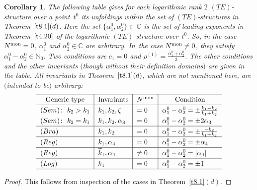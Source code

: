 \documentclass[pdftex]{sigma}%
\numberwithin{equation}{section}
\numberwithin{figure}{section}
\newcommand{\N}{{\mathbb N}}
\newcommand{\C}{{\mathbb C}}
\newcommand{\www}{\widetilde}
\newtheorem{Corollary}[Theorem]{Corollary}
\begin{document}
\begin{Corollary}\label{t8.3}
The following table gives for each logarithmic rank $2$
$(TE)$-structure over a point~$t^0$ its unfoldings within
the set of $(TE)$-structures in Theorem~$\ref{t8.1}(d)$.
Here the set $\big\{\alpha_1^0,\alpha_2^0\big\}\subset\C$ is the
set of leading exponents in Theorem~$\ref{t4.20}$ of the
logarithmic $(TE)$-structure over~$t^0$.
So, in the case $N^{\rm mon}=0$, $\alpha_1^0$ and $\alpha_2^0\in\C$
are arbitrary. In~the case $N^{\rm mon}\neq 0$, they satisfy
$\alpha_1^0-\alpha_2^0\in\N_0$. Two conditions are
$c_1=0$ and $\rho^{(1)}=\frac{\alpha_1^0+\alpha_2^0}{2}$.
The other conditions and the other invariants
$($though without their definition domains$)$
are given in the table.
All invariants in Theorem~$\ref{t8.1}(d)$, which are not
mentioned here, are $($intended to be$)$ arbitrary:
\begin{gather}\label{8.11}
\def\arraystretch{1.25}
\begin{tabular}{l|l|l|l}
\hline
\multicolumn{1}{c|}{Generic type}&\multicolumn{1}{c|}{Invariants} & \multicolumn{1}{c|}{$N^{\rm mon}$} &\multicolumn{1}{c}{Condition}
\\
\hline
$(Sem)\colon\ k_2>k_1$ & $k_1,k_2,\zeta$ & $=0$&
$\alpha_1^0-\alpha_2^0=\pm \frac{k_1-k_2}{k_1+k_2}$
\\
$(Sem)\colon\ k_2=k_1$ & $k_1,k_2,\alpha_3$ & $=0$&
$\alpha_1^0-\alpha_2^0=\pm 2\alpha_3$
\\
\hline
$(Bra)$ & $k_1,k_2$ &$ =0$&$\alpha_1^0-\alpha_2^0=\pm \frac{-k_2}{k_1+k_2} $
\\
\hline
$(Reg)$ & $k_1,\alpha_4$ & $=0$ &$\alpha_1^0-\alpha_2^0=\pm \alpha_4$
\\
\hline
$(Reg)$ & $\www k_1,\alpha_4$ & $\neq 0$ &$\alpha_1^0-\alpha_2^0=|\alpha_4| $
\\
\hline
$(Log)$ &$ k_1$ & $=0$ & $\alpha_1^0-\alpha_2^0=\pm 1$
\\
\hline
\end{tabular}
\end{gather}
\end{Corollary}

\begin{proof} This follows from inspection of the cases
in Theorem~\ref{t8.1}$(d)$.
\end{proof}
\end{document}
